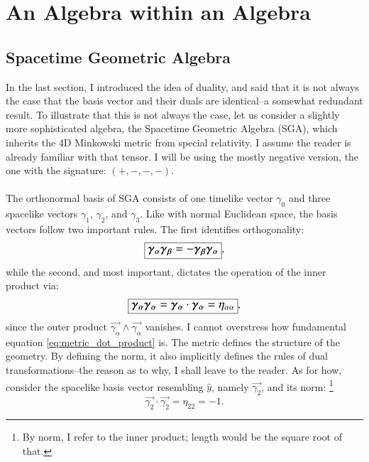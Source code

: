 
\section{An Algebra within an Algebra}

\subsection{Spacetime Geometric Algebra}
In the last section, I introduced the idea of duality, and said that it is not always the case that the basis vector and their duals are identical--a somewhat redundant result. To illustrate that this is not always the case, let us consider a slightly more sophisticated algebra, the Spacetime Geometric Algebra (SGA), which inherits the 4D Minkowski metric from special relativity. I assume the reader is already familiar with that tensor. I will be using the mostly negative version, the one with the signature: $(+, -, -, -)$.
\\ \\ 
The orthonormal basis of SGA consists of one timelike vector $\gamma_0$ and three spacelike vectors $\gamma_1$, $\gamma_2$, and $\gamma_3$. Like with normal Euclidean space, the basis vectors follow two important rules. The first identifies orthogonality:
\begin{equation}
   \large\boxed{ \vec{\gamma_\alpha} \vec{\gamma_\beta} = -\vec{\gamma_\beta}\vec{\gamma_\alpha}},
\end{equation}
while the second, and most important, dictates the operation of the inner product via:
\begin{equation} \label{eq:metric_dot_product}
    \large\boxed{\vec{\gamma_\alpha}\vec{\gamma_\alpha} = \vec{\gamma_\alpha} \cdot \vec{\gamma_\alpha} = \large{ \eta_{\alpha\alpha}}},
\end{equation} 
since the outer product $\vec{\gamma_\alpha} \wedge \vec{\gamma_\alpha}$ vanishes. I cannot overstress how fundamental equation \eqref{eq:metric_dot_product} is. The metric defines the structure of the geometry. By defining the norm, it also implicitly defines the rules of dual transformations--the reason as to why, I shall leave to the reader. As for how, consider the spacelike basis vector resembling $\hat{y}$, namely $\vec{\gamma_2}$, and its norm: \footnote{By norm, I refer to the inner product; length would be the square root of that.}
\begin{equation} \label{eq:dot_product_gamma_2}
\vec{\gamma_2} \cdot \vec{\gamma_2} = \eta_{22} = -1.
\end{equation}

